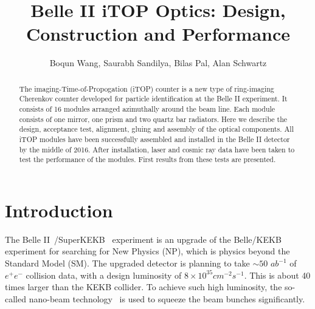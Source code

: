 \documentclass{llncs}
\begin{document}
\pagestyle{headings}

\mainmatter

\title{Belle II iTOP Optics: Design, Construction and Performance}


\author{Boqun Wang, Saurabh Sandilya, Bilas Pal, Alan Schwartz}



\maketitle

\begin{abstract}
  The imaging-Time-of-Propogation (iTOP) counter is a new type of
  ring-imaging Cherenkov counter developed for particle identification
  at the Belle II experiment. It consists of 16 modules arranged
  azimuthally around the beam line. Each module consists of one
  mirror, one prism and two quartz bar radiators. Here we describe the
  design, acceptance test, alignment, gluing and assembly of the
  optical components. All iTOP modules have been successfully
  assembled and installed in the Belle II detector by the middle of
  2016. After installation, laser and cosmic ray data have been taken
  to test the performance of the modules. First results from these
  tests are presented. 
\end{abstract}

\section{Introduction}


The Belle II~\cite{belle2}/SuperKEKB~\cite{superkekb} experiment is an
upgrade of the Belle/KEKB experiment for searching for New Physics
(NP), which is physics beyond the Standard Model (SM). The upgraded
detector is planning to take $\sim 50$ $ab^{-1}$ of $e^+e^-$ collision
data, with a design luminosity of $8 \times 10^{35} cm^{-2} s^{-1}$.
This is about 40 times larger than the KEKB collider. To achieve such
high luminosity, the so-called nano-beam technology~\cite{nano-beam}
is used to squeeze the beam bunches significantly.
\end{document}
